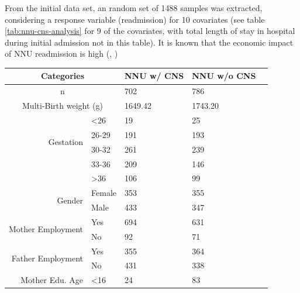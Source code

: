 \documentclass[11pt]{article}
\begin{document}
From the initial data set, an random set of 1488 samples was extracted, considering a response variable (readmission) for 10 covariates (see table \ref{tab:nnu-cns-analysis} for 9 of the covariates, with total length of stay in hospital during initial admission not in this table). It is known that the economic impact of NNU readmission is high (\cite{petrou2001}, \cite{boyle1983})

\begin{table}[ht]
    \centering
    \begin{tabular}{|r|l|l|l|l|}
        \hline
        \multicolumn{2}{|c|}{\textbf{Categories}}                       & \textbf{NNU w/ CNS} & \textbf{NNU w/o CNS} \\ \hline
        \multicolumn{2}{|c|}{n}                       & 702                 & 786                  \\ 
        \multicolumn{2}{|c|}{Multi-Birth weight (g)}  & 1649.42             & 1743.20              \\ \hline
        \multirow{4}{*}{Gestation} & \textless{}26  & 19                  & 25                   \\ 
        & 26-29             & 191                 & 193                  \\ 
        & 30-32             & 261                 & 239                  \\ 
        & 33-36             & 209                 & 146                  \\
        & \textgreater{}36  & 106                 & 99                   \\\hline 
        \multirow{2}{*}{Gender} & Female            & 353                 & 355                  \\ 
        & Male              & 433                 & 347                  \\ \hline
        \multirow{2}{*}{Mother Employment} & Yes               & 694                 & 631                  \\ 
        & No                & 92                  & 71                   \\ \hline
        \multirow{2}{*}{Father Employment} & Yes               & 355                 & 364                  \\ 
        & No                & 431                 & 338                  \\ \hline
        \multirow{4}{*}{Mother Edu. Age} & \textless{}16     & 24                  & 83                   \\ 

\end{tabular}
\end{table}
\end{document}
